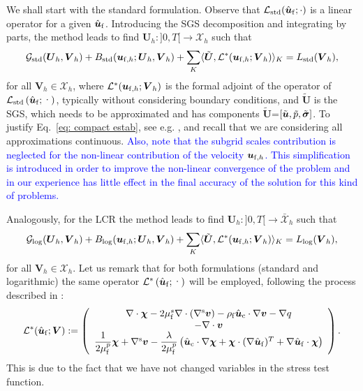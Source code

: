\documentclass[11pt,english]{article}
\def\ufluidh{\boldsymbol{u}_{{\rm{f}},h}}
\def\ufluidhat{\hat{\boldsymbol{u}}_{\rm{f}}}
\def\viscs{\mu^{s}_{\rm{f}}}
\def\viscp{\mu^{p}_{\rm{f}}}
\def\alevelocityhat{\hat{\boldsymbol{u}}_{\mathrm{c}}}
\begin{document}
We shall start with the standard formulation. Observe that $\mathcal{L}_{\text{std}}(\ufluidhat;\cdot)$ is a linear operator for a given $\ufluidhat$. Introducing the SGS decomposition and integrating by parts, the method leads to find $\boldsymbol{U}_{h}:]0,T[\longrightarrow\boldsymbol{\mathcal{X}}_{h}$ such that 
\begin{equation}
    \mathcal{G}_{\text{std}}(\boldsymbol{U}_{h},\boldsymbol{V}_{h})+B_{\text{std}}(\ufluidh;\boldsymbol{U}_{h},\boldsymbol{V}_{h})+\sum_{K}\langle\tilde{\boldsymbol{U}},\mathcal{L}^{*}(\ufluidh;\boldsymbol{V}_{h})\rangle_{K}=L_{\text{\text{std}}}(\boldsymbol{V}_{h}),\label{eq: compact estab}
\end{equation}
for all $\boldsymbol{V}_{h}\in\boldsymbol{\mathcal{X}}_{h}$, where $\mathcal{L}^{*}(\ufluidh;\boldsymbol{V}_{h})$ is the formal 
adjoint of the operator of $\mathcal{L}_{\text{std}}\left(\ufluidhat;\text{·}\right)$, typically without considering boundary conditions, and $\tilde{\boldsymbol{U}}$ is the SGS, which needs to be approximated and has components $\tilde{\boldsymbol{U}}$=$\left[\tilde{\boldsymbol{u}},\tilde{p},\tilde{\text{\ensuremath{\boldsymbol{\sigma}}}}\right]$. To justify Eq.~\eqref{eq: compact estab}, see e.g. \cite{Codina2018Variational}, and recall that we are considering all approximations continuous. \textcolor{blue}{Also, note that the subgrid scales contribution is neglected for the non-linear contribution of the velocity $\ufluidh$. This simplification is introduced in order to improve the non-linear convergence of the problem and in our experience has little effect in the final accuracy of the solution for this kind of problems.}

Analogously, for the LCR the method leads to find $\boldsymbol{U}_{h}:]0,T[\longrightarrow\bar{\boldsymbol{\mathcal{X}}}_{h}$ such that 
\begin{equation}
    \mathcal{G}_{\text{log}}(\boldsymbol{U}_{h},\boldsymbol{V}_{h})+B_{\text{log}}(\ufluidh;\boldsymbol{U}_{h},\boldsymbol{V}_{h})+\sum_{K}\langle\tilde{\boldsymbol{U}},\mathcal{L}^{*}(\ufluidh;\boldsymbol{V}_{h})\rangle_{K}=L_{\text{\text{log}}}(\boldsymbol{V}_{h}),\label{eq: compact estab_LOG}
\end{equation}
for all $\boldsymbol{V}_{h}\in\boldsymbol{\mathcal{X}}_{h}$. Let us remark that for both formulations (standard and logarithmic) the same operator $\mathcal{L}^{*}\left(\ufluidhat;\text{·}\right)$ will be employed, following the process described in \cite{moreno2019logarithmic}:
\[
    \mathcal{L^{*}}(\ufluidhat;\boldsymbol{V}):=\left(\begin{array}{c}
    \nabla\cdot\boldsymbol{\chi}-2\viscs\nabla\cdot(\nabla^{\rm s}\boldsymbol{v})-\rho_{\rm{f}}\alevelocityhat\cdot\nabla\boldsymbol{v}-\nabla q\\
    -\nabla\cdot\boldsymbol{v}\\
    \dfrac{1}{2\viscp}\boldsymbol{\chi}+\nabla^{\rm s}\boldsymbol{v}-\dfrac{\lambda}{2\viscp}\left(\alevelocityhat\cdot\nabla\boldsymbol{\chi}+\boldsymbol{\chi}\cdot(\nabla\ufluidhat)^{T}+\nabla\ufluidhat\cdot\boldsymbol{\chi}\right)
    \end{array}\right).
\]
This is due to the fact that we have not changed variables in the
stress test function.
\end{document}
